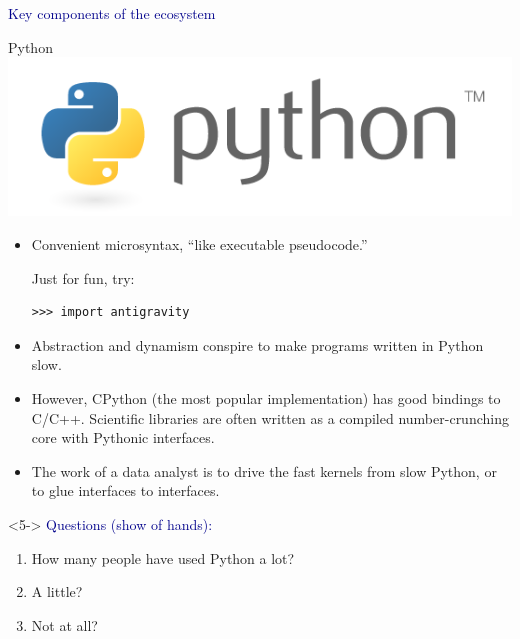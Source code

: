 \documentclass[aspectratio=169]{beamer}
\begin{document}
\begin{frame}{}
\begin{center}
\LARGE \textcolor{darkblue}{Key components of the ecosystem}
\end{center}
\end{frame}

\begin{frame}[fragile]{Python}
\vspace{0.5 cm}
\hfill \includegraphics[height=1 cm]{python-logo.png}

\vspace{-1 cm}
\begin{itemize}\setlength{\itemsep}{0.25 cm}
\item Convenient microsyntax, ``like executable pseudocode.''

Just for fun, try:

\small
\begin{verbatim}
>>> import antigravity
\end{verbatim}
\normalsize

\item<2-> Abstraction and dynamism conspire to make programs written in Python slow.

\item<3-> However, CPython (the most popular implementation) has good bindings to C/C++. Scientific libraries are often written as a compiled number-crunching core with Pythonic interfaces.

\item<4-> The work of a data analyst is to drive the fast kernels from slow Python, or to glue interfaces to interfaces.
\end{itemize}

\vspace{0.25 cm}
\begin{uncoverenv}<5->
\small
\textcolor{darkblue}{Questions (show of hands):}
\vspace{-0.2 cm}
\begin{enumerate}\setlength{\itemsep}{-0.1 cm}
\item How many people have used Python a lot?
\item A little?
\item Not at all?
\end{enumerate}
\end{uncoverenv}
\end{frame}
\end{document}
